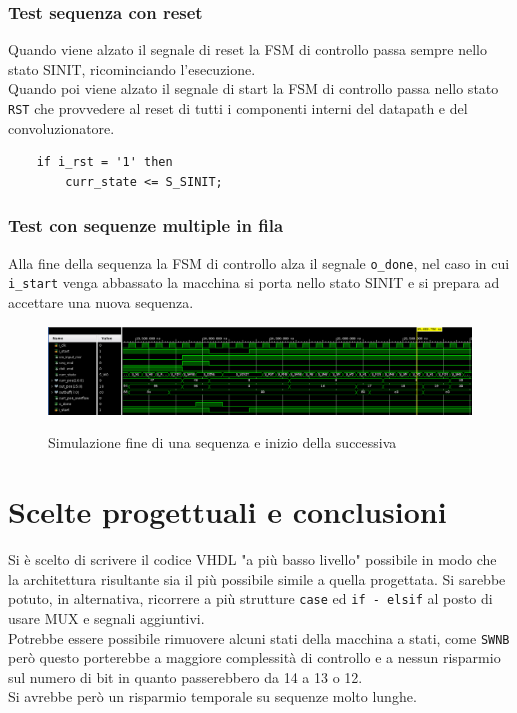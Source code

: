 \documentclass[12pt, a4paper]{article}
\begin{document}

\pagebreak

\vspace{10cm}

\subsubsection{Test sequenza con reset}

Quando viene alzato il segnale di reset la FSM di controllo passa sempre nello stato SINIT, ricominciando l'esecuzione.\\
\noindent Quando poi viene alzato il segnale di start la FSM di controllo passa nello stato \texttt{RST}
che provvedere al reset di tutti i componenti interni del datapath e del convoluzionatore.

\begin{verbatim}
    if i_rst = '1' then
        curr_state <= S_SINIT;
\end{verbatim}

\subsubsection{Test con sequenze multiple in fila}

Alla fine della sequenza la FSM di controllo alza il segnale \texttt{o\_done}, nel caso in cui \texttt{i\_start} venga abbassato
la macchina si porta nello stato SINIT e si prepara ad accettare una nuova sequenza.

\begin{figure}[h!]
    \centering
    \includegraphics[scale=0.3]{sim_mult_seq.png}
    \label{img:sim_multseq_change}
    \caption{Simulazione fine di una sequenza e inizio della successiva}
\end{figure}

\section{Scelte progettuali e conclusioni}

Si è scelto di scrivere il codice VHDL "a più basso livello" possibile in modo
che la architettura risultante sia il più possibile simile a quella progettata.
Si sarebbe potuto, in alternativa, ricorrere a più strutture \texttt{case} ed \texttt{if - elsif} 
al posto di usare MUX e segnali aggiuntivi.\\

\noindent Potrebbe essere possibile rimuovere alcuni stati della macchina a stati, come \texttt{SWNB}
però questo porterebbe a maggiore complessità di controllo e a nessun risparmio sul numero di bit in quanto passerebbero
da 14 a 13 o 12.\\
Si avrebbe però un risparmio temporale su sequenze molto lunghe.
\end{document}
